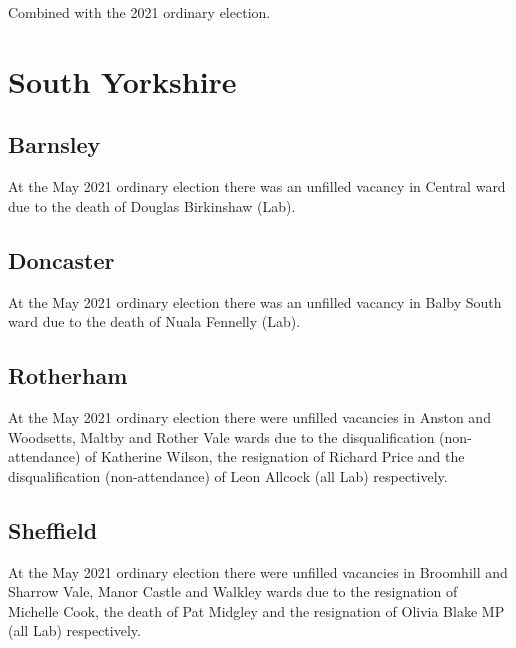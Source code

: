 \documentclass[a4paper,openany]{book}
\begin{document}
\begin{resultsiii}
Combined with the 2021 ordinary election.

\section{South Yorkshire}

\subsection*{Barnsley}

At the May 2021 ordinary election there was an unfilled vacancy in Central ward due to the death of Douglas Birkinshaw (Lab).

\subsection*{Doncaster}

At the May 2021 ordinary election there was an unfilled vacancy in Balby South ward due to the death of Nuala Fennelly (Lab).

\subsection*{Rotherham}

At the May 2021 ordinary election there were unfilled vacancies in Anston and Woodsetts, Maltby and Rother Vale wards due to the disqualification (non-attendance) of Katherine Wilson, the resignation of Richard Price and the disqualification (non-attendance) of Leon Allcock (all Lab) respectively.

\subsection*{Sheffield}

At the May 2021 ordinary election there were unfilled vacancies in Broomhill and Sharrow Vale, Manor Castle and Walkley wards due to the resignation of Michelle Cook, the death of Pat Midgley and the resignation of Olivia Blake MP (all Lab) respectively.


\end{resultsiii}
\end{document}
